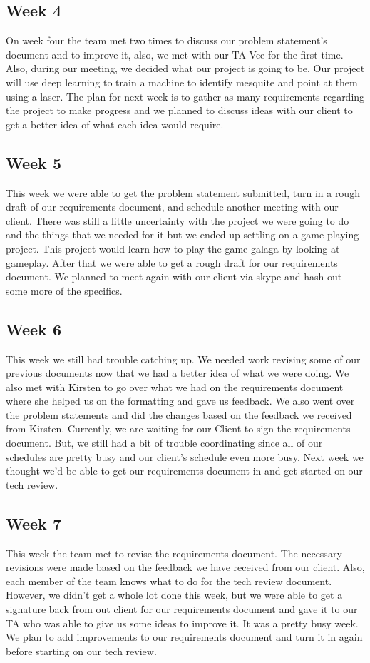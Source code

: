 \documentclass[onecolumn, draftclsnofoot,10pt, compsoc]{IEEEtran}
\begin{document}
\subsection{Week 4}
On week four the team met two times to discuss our problem statement's document and to improve it, also, we met with our TA Vee for the first time.
Also, during our meeting, we decided what our project is going to be.
Our project will use deep learning to train a machine to identify mesquite and point at them using a laser.
The plan for next week is to gather as many requirements regarding the project to make progress and we planned to discuss ideas with our client to get a better idea of what each idea would require.

\subsection{Week 5}
This week we were able to get the problem statement submitted, turn in a rough draft of our requirements document, and schedule another meeting with our client.
There was still a little uncertainty with the project we were going to do and the things that we needed for it but we ended up settling on a game playing project.
This project would learn how to play the game galaga by looking at gameplay.
After that we were able to get a rough draft for our requirements document.
We planned to meet again with our client via skype and hash out some more of the specifics.

\subsection{Week 6}
This week we still had trouble catching up.
We needed work revising some of our previous documents now that we had a better idea of what we were doing.
We also met with Kirsten to go over what we had on the requirements document where she helped us on the formatting and gave us feedback.
We also went over the problem statements and did the changes based on the feedback we received from Kirsten.
Currently, we are waiting for our Client to sign the requirements document.
But, we still had a bit of trouble coordinating since all of our schedules are pretty busy and our client's schedule even more busy.
Next week we thought we'd be able to get our requirements document in and get started on our tech review.

\subsection{Week 7}
This week the team met to revise the requirements document.
The necessary revisions were made based on the feedback we have received from our client.
Also, each member of the team knows what to do for the tech review document.
However, we didn't get a whole lot done this week, but we were able to get a signature back from out client for our requirements document and gave it to our TA who was able to give us some ideas to improve it.
It was a pretty busy week. We plan to add improvements to our requirements document and turn it in again before starting on our tech review.
\end{document}

